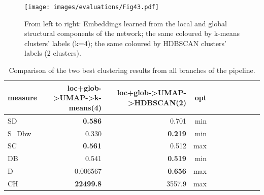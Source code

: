 \begin{figure}[!ht]
	\centering
	\texttt{[image: images/evaluations/Fig43.pdf]}\\
	\caption{From left to right: Embeddings learned from the local and global structural components of the network; the same coloured by k-means clusters' labels (k=4); the same coloured by HDBSCAN clusters' labels (2 clusters).}
	\label{fig:Fig43}
\end{figure}

\begin{table}
\begin{center}
\small
\begin{tabular}{lrrrrrrrrrr}
\hline
measure & loc+glob->UMAP->k-means(4) & loc+glob->UMAP->HDBSCAN(2) & opt\\
\hline
SD      & \textbf{0.586} & 0.701 & min \\
S\_Dbw  & 0.330 & \textbf{0.219} & min \\
SC      & \textbf{0.561} & 0.512 & max \\
DB      & 0.541 & \textbf{0.519} & min \\
D       & 0.006567 & \textbf{0.656} & max\\
CH      & \textbf{22499.8} & 3557.9 & max \\
\hline
\end{tabular}
\caption {Comparison of the two best clustering results from all branches of the pipeline.}
\label{tab:tab7}
\end{center}
\end {table}

